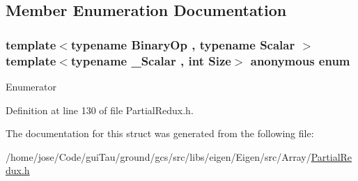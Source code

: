 \subsection{Member Enumeration Documentation}
\hypertarget{structei__member__redux_1_1_cost_a35c0b60f28d877c5cfbd8c3a2aff099e}{\subsubsection[{anonymous enum}]{\setlength{\rightskip}{0pt plus 5cm}template$<$typename Binary\-Op , typename Scalar $>$ template$<$typename \-\_\-\-Scalar , int Size$>$ anonymous enum}}\label{structei__member__redux_1_1_cost_a35c0b60f28d877c5cfbd8c3a2aff099e}
\begin{Desc}
\item[Enumerator]\par
\begin{description}
\item[{\em 
\hypertarget{structei__member__redux_1_1_cost_a35c0b60f28d877c5cfbd8c3a2aff099ea66714fc1f3603b689f6a436ee97c5845}{value}\label{structei__member__redux_1_1_cost_a35c0b60f28d877c5cfbd8c3a2aff099ea66714fc1f3603b689f6a436ee97c5845}
}]\end{description}
\end{Desc}


Definition at line 130 of file Partial\-Redux.\-h.



The documentation for this struct was generated from the following file\-:\begin{DoxyCompactItemize}
\item 
/home/jose/\-Code/gui\-Tau/ground/gcs/src/libs/eigen/\-Eigen/src/\-Array/\hyperlink{_partial_redux_8h}{Partial\-Redux.\-h}\end{DoxyCompactItemize}
